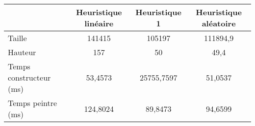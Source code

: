 \begin{center}
{\tabulinesep=1.2mm
\begin{tabu}{|l|c|c|c|}
  \hline
  & Heuristique linéaire  & Heuristique 1 & Heuristique aléatoire \\ 
  \hline
  Taille &    141415&    105197&  111894,9  \\ 
  \hline
  Hauteur &       157&        50&      49,4  \\ 
  \hline
  Temps constructeur (ms) &         53,4573&      25755,7597&         51,0537  \\ 
  \hline
  Temps peintre (ms) &          124,8024&          89,8473&          94,6599  \\ 
  \hline
\end{tabu}
}
\end{center}

